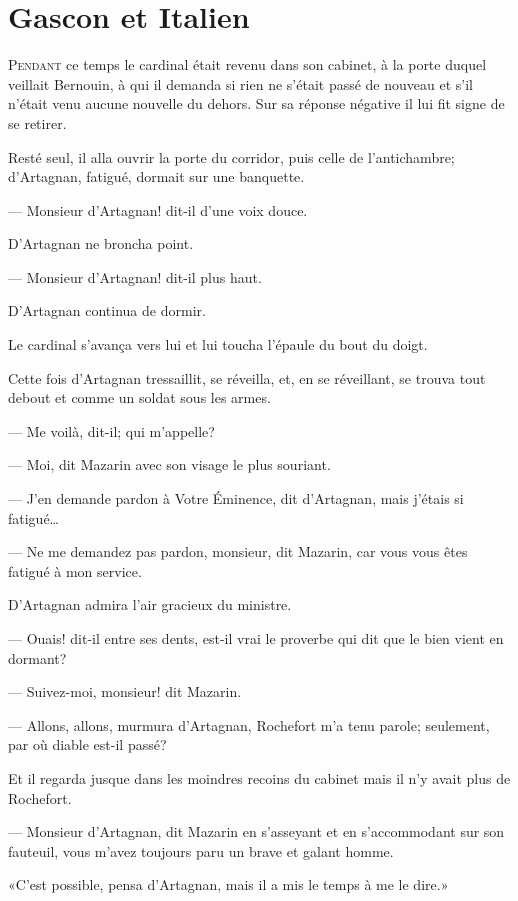 \chapter{Gascon et Italien}

\lettrine{P}{endant} ce temps le cardinal était revenu dans son cabinet, à la porte duquel veillait Bernouin, à qui il demanda si rien ne s'était passé de nouveau et s'il n'était venu aucune nouvelle du dehors. Sur sa réponse négative il lui fit signe de se retirer.

Resté seul, il alla ouvrir la porte du corridor, puis celle de l'antichambre; d'Artagnan, fatigué, dormait sur une banquette.

— Monsieur d'Artagnan! dit-il d'une voix douce.

D'Artagnan ne broncha point.

— Monsieur d'Artagnan! dit-il plus haut.

D'Artagnan continua de dormir.

Le cardinal s'avança vers lui et lui toucha l'épaule du bout du doigt.

Cette fois d'Artagnan tressaillit, se réveilla, et, en se réveillant, se trouva tout debout et comme un soldat sous les armes.

— Me voilà, dit-il; qui m'appelle?

— Moi, dit Mazarin avec son visage le plus souriant.

— J'en demande pardon à Votre Éminence, dit d'Artagnan, mais j'étais si fatigué\dots

— Ne me demandez pas pardon, monsieur, dit Mazarin, car vous vous êtes fatigué à mon service.

D'Artagnan admira l'air gracieux du ministre.

— Ouais! dit-il entre ses dents, est-il vrai le proverbe qui dit que le bien vient en dormant?

— Suivez-moi, monsieur! dit Mazarin.

— Allons, allons, murmura d'Artagnan, Rochefort m'a tenu parole; seulement, par où diable est-il passé?

Et il regarda jusque dans les moindres recoins du cabinet mais il n'y avait plus de Rochefort.

— Monsieur d'Artagnan, dit Mazarin en s'asseyant et en s'accommodant sur son fauteuil, vous m'avez toujours paru un brave et galant homme.

«C'est possible, pensa d'Artagnan, mais il a mis le temps à me le dire.»

